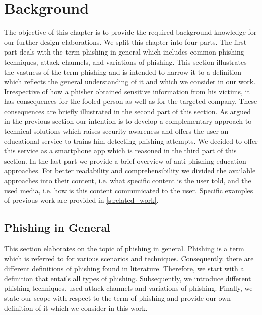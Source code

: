 \section{Background}
\label{s:background}
The objective of this chapter is to provide the required background knowledge for our further design elaborations. 
We split this chapter into four parts.
The first part deals with the term phishing in general which includes common phishing techniques, attack channels, and variations of phishing.
This section illustrates the vastness of the term phishing and is intended to narrow it to a definition which reflects the general understanding of it and which we consider in our work.
Irrespective of how a phisher obtained sensitive information from his victims, it has consequences for the fooled person as well as for the targeted company.
These consequences are briefly illustrated in the second part of this section.
As argued in the previous section our intention is to develop a complementary approach to technical solutions which raises security awareness and offers the user an educational service to trains him detecting phishing attempts.
We decided to offer this service as a smartphone app which is reasoned in the third part of this section.
In the last part we provide a brief overview of anti-phishing education approaches.
For better readability and comprehensibility we divided the available approaches into their content, i.e. what specific content is the user told, and the used media, i.e. how is this content communicated to the user. Specific examples of previous work are provided in \autoref{s:related_work}.

\subsection{Phishing in General}
\label{s:phishing_general}
This section elaborates on the topic of phishing in general.
Phishing is a term which is referred to for various scenarios and techniques.
Consequently, there are different definitions of phishing found in literature.
Therefore, we start with a definition that entails all types of phishing.
Subsequently, we introduce different phishing techniques, used attack channels and variations of phishing.
Finally, we state our scope with respect to the term of phishing and provide our own definition of it which we consider in this work.
